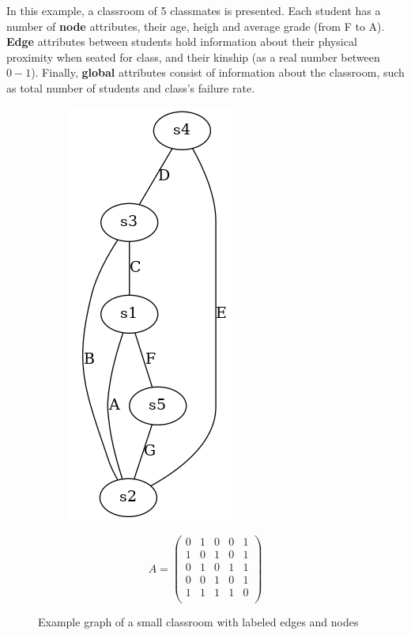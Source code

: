   \begin{example}
    In this example, a classroom of 5 classmates is presented. Each student
    has a number of \textbf{node} attributes, their age, heigh and average
    grade (from F to A). \textbf{Edge} attributes between students hold
    information about their physical proximity when seated for class,
    and their kinship (as a real number between $0-1$). Finally,
    \textbf{global} attributes consist of information about the classroom,
    such as total number of students and class's failure rate.
    \begin{figure}[!h]
     \begin{subfigure}[c]{0.4\textwidth}
         \centering
         \includegraphics[scale=0.45]{Figures/chapter1/example_node_properties.png}
     \end{subfigure}
     \hfill
     \begin{subfigure}[c]{0.4\textwidth}
       \centering
       \begin{equation*}
         A = 
\begin{pmatrix}
0 & 1 & 0 & 0 & 1 \\
1 & 0 & 1 & 0 & 1 \\
0 & 1 & 0 & 1 & 1 \\
0 & 0 & 1 & 0 & 1 \\
1 & 1 & 1 & 1 & 0 \\ 
\end{pmatrix} \end{equation*}
\label{table:properties_example}
\end{subfigure}
  \caption{Example graph of a small classroom with labeled edges and nodes}
  \label{fig:properties_example}
\end{figure}


\end{example}
